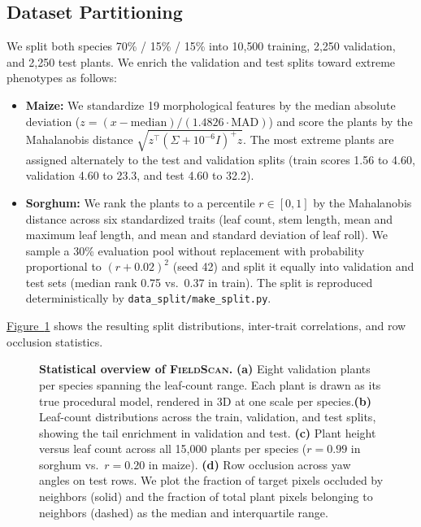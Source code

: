 \documentclass[10pt,twocolumn,letterpaper]{article}
\newcommand{\Figref}[1]{\hyperref[#1]{Figure~\ref*{#1}}}
\newcommand{\dataset}{\textup{\textsc{FieldScan}}}
\begin{document}
\subsection{Dataset Partitioning}
We split both species 70\% / 15\% / 15\% into 10{,}500 training, 2{,}250 validation, and 2{,}250 test plants. We enrich the validation and test splits toward extreme phenotypes as follows:
\begin{itemize}
  \item \textbf{Maize:} We standardize 19 morphological features by the median absolute deviation ($z = (x - \mathrm{median}) / (1.4826 \cdot \mathrm{MAD})$) and score the plants by the Mahalanobis distance $\sqrt{z^\top (\Sigma + 10^{-6}I)^{+} z}$. The most extreme plants are assigned alternately to the test and validation splits (train scores 1.56 to 4.60, validation 4.60 to 23.3, and test 4.60 to 32.2).
  \item \textbf{Sorghum:} We rank the plants to a percentile $r \in [0,1]$ by the Mahalanobis distance across six standardized traits (leaf count, stem length, mean and maximum leaf length, and mean and standard deviation of leaf roll). We sample a 30\% evaluation pool without replacement with probability proportional to $(r + 0.02)^2$ (seed 42) and split it equally into validation and test sets (median rank 0.75 vs.\ 0.37 in train). The split is reproduced deterministically by \texttt{data\_split/make\_split.py}.
\end{itemize}
\Figref{fig:dataset_stats} shows the resulting split distributions, inter-trait correlations, and row occlusion statistics.

\begin{figure}[t]
  \centering
  \resizebox{0.9\linewidth}{!}{}
  \caption{\textbf{Statistical overview of \dataset{}.} \textbf{(a)} Eight validation plants per species spanning the leaf-count range. Each plant is drawn as its true procedural model, rendered in 3D at one scale per species.\textbf{(b)} Leaf-count distributions across the train, validation, and test splits, showing the tail enrichment in validation and test. \textbf{(c)} Plant height versus leaf count across all 15{,}000 plants per species ($r = 0.99$ in sorghum vs.\ $r = 0.20$ in maize). \textbf{(d)} Row occlusion across yaw angles on test rows. We plot the fraction of target pixels occluded by neighbors (solid) and the fraction of total plant pixels belonging to neighbors (dashed) as the median and interquartile range.}
  \label{fig:dataset_stats}
\end{figure}
\end{document}
